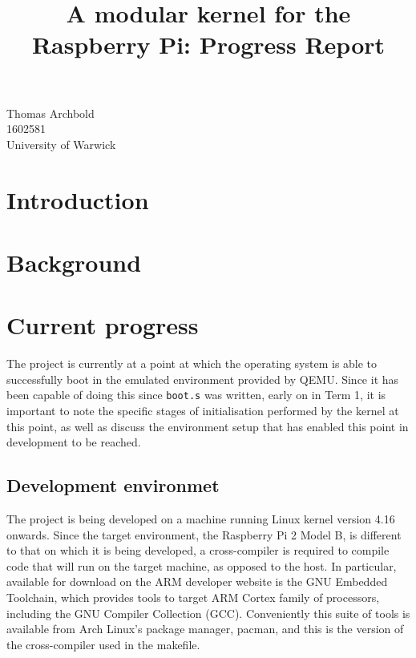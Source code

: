 \documentclass[10pt,a4paper]{article}
\title{A modular kernel for the Raspberry Pi: Progress Report}
\newcommand{\code}[1]{\texttt{#1}}
\begin{document}
\maketitle

\begin{center}
    Thomas Archbold \\
    1602581 \\
    University of Warwick \\
\end{center}

\section{Introduction}

\section{Background}

\section{Current progress}
The project is currently at a point at which the operating system is able to
successfully boot in the emulated environment provided by QEMU. Since it has
been capable of doing this since \code{boot.s} was written, early on in Term 1,
it is important to note the specific stages of initialisation performed by the
kernel at this point, as well as discuss the environment setup that has enabled
this point in development to be reached.

\subsection{Development environmet}
The project is being developed on a machine running Linux kernel version 4.16
onwards. Since the target environment, the Raspberry Pi 2 Model B, is different
to that on which it is being developed, a cross-compiler is required to compile
code that will run on the target machine, as opposed to the host. In particular,
available for download on the ARM developer website \cite{GNUtoolchain} is the
GNU Embedded Toolchain, which provides tools to target ARM Cortex family of
processors, including the GNU Compiler Collection (GCC). Conveniently this suite
of tools is available from Arch Linux's package manager, pacman, and this is the
version of the cross-compiler used in the makefile.
\end{document}
